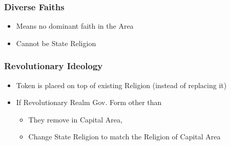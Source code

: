 \documentclass[10pt]{article}
\begin{document}
\subsubsection*{Diverse Faiths}
\begin{itemize}
	\item Means no dominant faith in the Area
	\item Cannot be State Religion
\end{itemize}

\subsubsection*{Revolutionary Ideology}
\begin{itemize}
	\item Token is placed on top of existing Religion (instead of replacing it)
	\item If Revolutionary Realm  Gov. Form other than 
	\begin{itemize}
		\item They remove \revolution in Capital Area, 
		\item Change State Religion to match the Religion of Capital Area
	\end{itemize}
\end{itemize}
\end{document}
